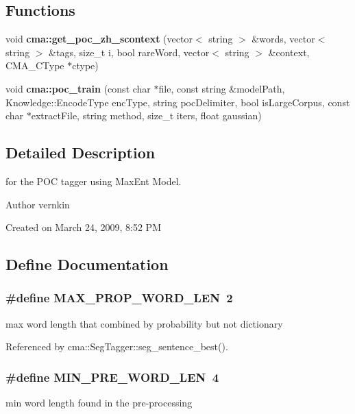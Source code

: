 \subsection*{Functions}
\begin{DoxyCompactItemize}
\item 
void {\bf cma::get\_\-poc\_\-zh\_\-scontext} (vector$<$ string $>$ \&words, vector$<$ string $>$ \&tags, size\_\-t i, bool rareWord, vector$<$ string $>$ \&context, CMA\_\-CType $\ast$ctype)
\item 
void {\bf cma::poc\_\-train} (const char $\ast$file, const string \&modelPath, Knowledge::EncodeType encType, string pocDelimiter, bool isLargeCorpus, const char $\ast$extractFile, string method, size\_\-t iters, float gaussian)
\end{DoxyCompactItemize}


\subsection{Detailed Description}
for the POC tagger using MaxEnt Model. \begin{DoxyAuthor}{Author}
vernkin
\end{DoxyAuthor}
Created on March 24, 2009, 8:52 PM 

\subsection{Define Documentation}
\subsubsection[{MAX\_\-PROP\_\-WORD\_\-LEN}]{\setlength{\rightskip}{0pt plus 5cm}\#define MAX\_\-PROP\_\-WORD\_\-LEN~2}\label{CMAPOCTagger_8h_a8fc9320f6cd5f28fb162b4827bb441e5}
max word length that combined by probability but not dictionary 

Referenced by cma::SegTagger::seg\_\-sentence\_\-best().
\subsubsection[{MIN\_\-PRE\_\-WORD\_\-LEN}]{\setlength{\rightskip}{0pt plus 5cm}\#define MIN\_\-PRE\_\-WORD\_\-LEN~4}\label{CMAPOCTagger_8h_a9447760a054b1929f095f9ba142b9b21}
min word length found in the pre-\/processing 